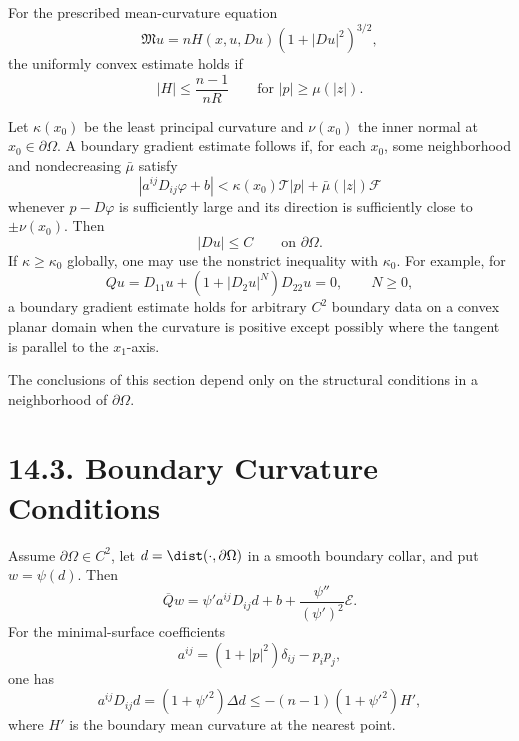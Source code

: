 For the prescribed mean-curvature equation
\begin{equation}
\mathfrak Mu=nH(x,u,Du)(1+|Du|^2)^{3/2},
\tag{14.35}
\end{equation}
the uniformly convex estimate holds if
\begin{equation}
|H|\leq\frac{n-1}{nR}
\qquad\text{for }|p|\geq\mu(|z|).
\tag{14.36}
\end{equation}

\begin{remark}
\label{gt14-boundary-gradient-14-r1}
Let $\kappa(x_0)$ be the least principal curvature and $\nu(x_0)$ the inner
normal at $x_0\in\partial\Omega$. A boundary gradient estimate follows if, for
each $x_0$, some neighborhood and nondecreasing $\bar\mu$ satisfy
\begin{equation}
|a^{ij}D_{ij}\varphi+b|
<\kappa(x_0)\mathcal T|p|+\bar\mu(|z|)\mathcal F
\tag{14.37}
\end{equation}
whenever $p-D\varphi$ is sufficiently large and its direction is sufficiently
close to $\pm\nu(x_0)$. Then
\begin{equation}
|Du|\leq C\qquad\text{on }\partial\Omega.
\tag{14.38}
\end{equation}
If $\kappa\geq\kappa_0$ globally, one may use the nonstrict inequality with
$\kappa_0$. For example, for
\begin{equation}
Qu=D_{11}u+(1+|D_2u|^N)D_{22}u=0,\qquad N\geq0,
\tag{14.39}
\end{equation}
a boundary gradient estimate holds for arbitrary $C^2$ boundary data on a
convex planar domain when the curvature is positive except possibly where the
tangent is parallel to the $x_1$-axis.
\end{remark}

The conclusions of this section depend only on the structural conditions in a
neighborhood of $\partial\Omega$.

\section*{14.3. Boundary Curvature Conditions}

Assume $\partial\Omega\in C^2$, let $d=\dist(\cdot,\partial\Omega)$ in a smooth
boundary collar, and put $w=\psi(d)$. Then
\begin{equation}
\overline Qw
=\psi'a^{ij}D_{ij}d+b+\frac{\psi''}{(\psi')^2}\mathcal E.
\tag{14.40}
\end{equation}
For the minimal-surface coefficients
\begin{equation}
a^{ij}=(1+|p|^2)\delta_{ij}-p_ip_j,
\tag{14.41}
\end{equation}
one has
\begin{equation}
a^{ij}D_{ij}d=(1+\psi'^2)\Delta d
\leq-(n-1)(1+\psi'^2)H',
\tag{14.42}
\end{equation}
where $H'$ is the boundary mean curvature at the nearest point.

